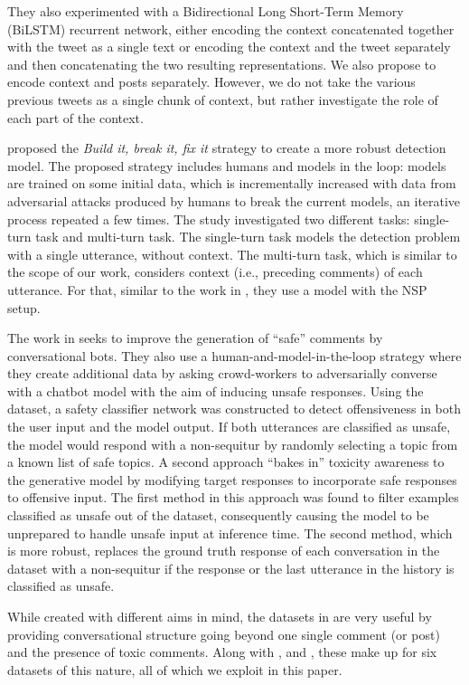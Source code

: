\documentclass[acmsmall]{acmart}
\begin{document}
They also experimented with a Bidirectional Long Short-Term Memory (BiLSTM) recurrent network, either encoding the context concatenated together with the tweet as a single text or encoding the context and the tweet separately and then concatenating the two resulting representations. We also propose to encode context and posts separately. However, we do not take the various previous tweets as a single chunk of context, but rather investigate the role of each part of the context.

\cite{dialogue_safety} proposed the {\em Build it, break it, fix it} strategy to create a more robust detection model. The proposed strategy includes humans and models in the loop: models are trained on some initial data, which is incrementally increased with data from adversarial attacks produced by humans to break the current models, an iterative process repeated a few times. The study investigated two different tasks: single-turn task and multi-turn task. The single-turn task models the detection problem with a single utterance, without context. The multi-turn task, which is similar to the scope of our work, considers context (i.e., preceding comments) of each utterance. For that, similar to the work in \cite{FBK}, they use a model with the NSP setup.

The work in \cite{xu-etal-2021-bot} seeks to improve the generation of ``safe'' comments by conversational bots. They also use a human-and-model-in-the-loop strategy where they create additional data by asking crowd-workers to adversarially converse with a chatbot model with the aim of inducing unsafe responses. Using the dataset, a safety classifier network was constructed to detect offensiveness in both the user input and the model output. If both utterances are classified as unsafe, the model would respond with a non-sequitur by randomly selecting a topic from a known list of safe topics. A second approach ``bakes in'' toxicity awareness to the generative model by modifying target responses to incorporate safe responses to offensive input. The first method in this approach was found to filter examples classified as unsafe out of the dataset, consequently causing the model to be unprepared to handle unsafe input at inference time. The second method, which is more robust, replaces the ground truth response of each conversation in the dataset with a non-sequitur if the response or the last utterance in the history is classified as unsafe. 

While created with different aims in mind, the datasets in \cite{dialogue_safety,xu-etal-2021-bot} are very useful by providing conversational structure going beyond one single comment (or post) and the presence of toxic comments. Along with \cite{FBK}, \cite{hateful_qian} and \cite{contextual_abuse}, these make up for six datasets of this nature, all of which we exploit in this paper.
\end{document}
